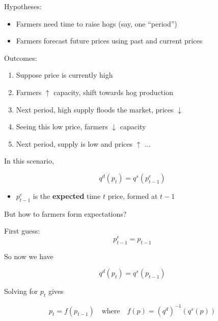 \documentclass[
    xcolor={svgnames,dvipsnames},
    hyperref={colorlinks, citecolor=DeepPink4, linkcolor=DarkRed, urlcolor=DarkBlue}
    ]{beamer}  %
\newcommand{\1}{\mathbbm 1}
\begin{document}
\begin{frame}
    
    Hypotheses: 

    \begin{itemize}
        \item Farmers need time to raise hogs (say, one ``period'')
            \vspace{0.3em}
        \item Farmers forecast future prices using past and current prices
    \end{itemize}

    Outcomes:

    \begin{enumerate}
        \item Suppose price is currently high
            \vspace{0.3em}
        \item Farmers $\uparrow$ capacity, shift towards hog production
            \vspace{0.3em}
        \item Next period, high supply floods the market, prices $\downarrow$
            \vspace{0.3em}
        \item Seeing this low price, farmers $\downarrow$ capacity
            \vspace{0.3em}
        \item Next period, supply is low and prices $\uparrow$ ...
    \end{enumerate}

\end{frame}

\begin{frame}

    In this scenario,
    
    $$
        q^d(p_t) = q^s(p^e_{t-1})
    $$

    \begin{itemize}
        \item $p^e_{t-1}$ is the \textbf{expected} time $t$ price, formed at $t-1$
    \end{itemize}

    \vspace{1em}
    \vspace{1em}

    But how to farmers form expectations?

\end{frame}

\begin{frame}
    
    First guess:
    \begin{equation*}
        p^e_{t-1} = p_{t-1}
    \end{equation*}

    So now we have

    $$
        q^d(p_t) = q^s(p_{t-1})
    $$

    Solving for $p_t$ gives

    $$
        p_t = f(p_{t-1})
        \quad \text{where} \quad
        f(p) = (q^d)^{-1} (q^s(p))
    $$

\end{frame}
\end{document}
